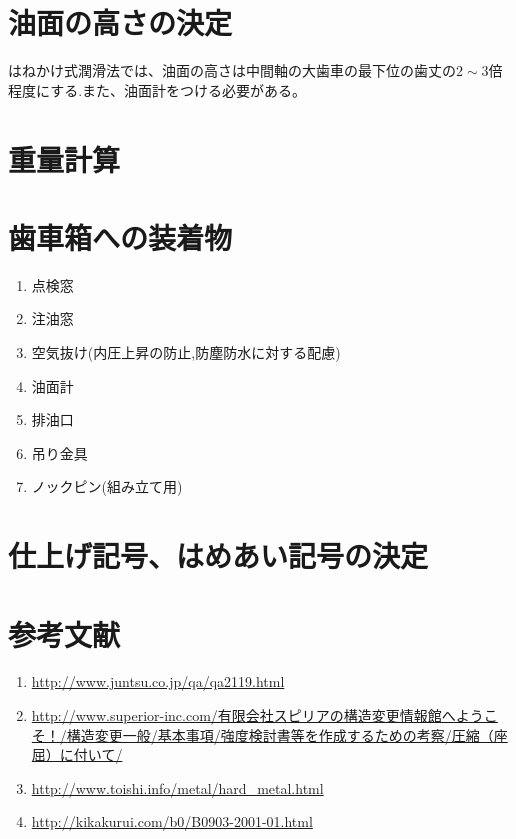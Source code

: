 \documentclass[a4j,twoside,openright,11pt]{jreport}
\begin{document}
\section{油面の高さの決定}
はねかけ式潤滑法では、油面の高さは中間軸の大歯車の最下位の歯丈の$2\sim3$倍程度にする.また、油面計をつける必要がある。
\section{重量計算}

\section{歯車箱への装着物}
\begin{enumerate}
\item 点検窓
\item 注油窓
\item 空気抜け(内圧上昇の防止,防塵防水に対する配慮)
\item 油面計
\item 排油口
\item 吊り金具
\item ノックピン(組み立て用)
\end{enumerate}
\section{仕上げ記号、はめあい記号の決定}

\section{参考文献}
\begin{enumerate}
\item \url{http://www.juntsu.co.jp/qa/qa2119.html}
\item \url{http://www.superior-inc.com/有限会社スピリアの構造変更情報館へようこそ！/構造変更一般/基本事項/強度検討書等を作成するための考察/圧縮（座屈）に付いて/}
\item \url{http://www.toishi.info/metal/hard_metal.html}
\item \url{http://kikakurui.com/b0/B0903-2001-01.html}
\end{enumerate}
\end{document}
